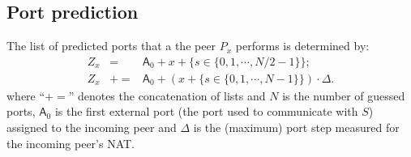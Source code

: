 \subsection{Port prediction}
The list of predicted ports that a the peer $P_x$ performs is
determined by:
\begin{equation}
  \begin{array}{rcl}
    Z_x & = & \textsf{A}_0 + x + \{s\in\{0,1,\cdots,N/2-1\}\}; \\
    Z_x & += & \textsf{A}_0 + (x + \{s\in\{0,1,\cdots, N-1\}\}) \cdot \Delta.
  \end{array}
\end{equation}
where ``$+=$'' denotes the concatenation of lists and $N$ is the
number of guessed ports, $\textsf{A}_0$ is the first external port (the
port used to communicate with $S$) assigned to the incoming peer and
$\Delta$ is the (maximum) port step measured for the incoming peer's
NAT.
